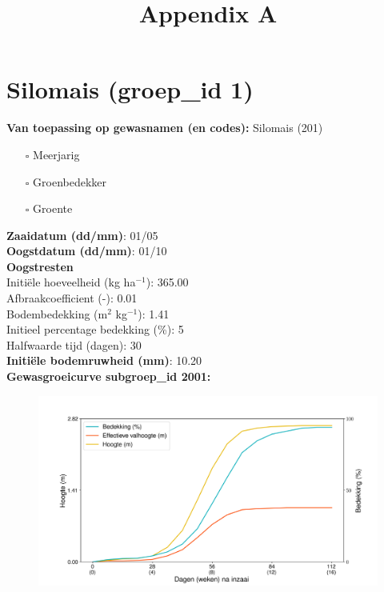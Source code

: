\documentclass{article}
\title{Appendix A}
\date{}
\begin{document}
\setlength\parindent{0pt}
\newcommand\tab[1][1cm]{\hspace*{#1}}
\section{Silomais (groep\_id 1)} 
 \textbf{Van toepassing op gewasnamen (en codes):} Silomais (201) 
 \begin{multicols}{3} \begin{itemize} \item[$\square$] Meerjarig \item[$\square$] Groenbedekker \item[$\square$] Groente \end{itemize} \end{multicols} 
  \textbf{Zaaidatum (dd/mm)}: 01/05  \vspace{0.10cm} \\ 
  \textbf{Oogstdatum (dd/mm)}: 01/10  \vspace{0.10cm} \\ 
  \textbf{Oogstresten} \vspace{0.05cm} \\ 
  \tab Initi\"{e}le hoeveelheid (kg ha$^{-1}$): 365.00 \vspace{0.05cm} \\ 
  \tab Afbraakcoefficient (-): 0.01 \vspace{0.05cm} \\ 
  \tab Bodembedekking (m$^2$ kg$^{-1}$): 1.41 \vspace{0.05cm} \\ 
  \tab Initieel percentage bedekking (\%): 5 \vspace{0.05cm} \\ 
  \tab Halfwaarde tijd (dagen): 30 \vspace{0.05cm} \\ 
  \textbf{Initi\"{e}le bodemruwheid (mm)}: 10.20 \vspace{0.05cm} \\ 
  \textbf{Gewasgroeicurve subgroep\_id 2001:} 
 \begin{center} \begin{figure}[H] \includegraphics[width=12.5cm]{temp/2001.png} \end{figure} \end{center} 
\end{document}
